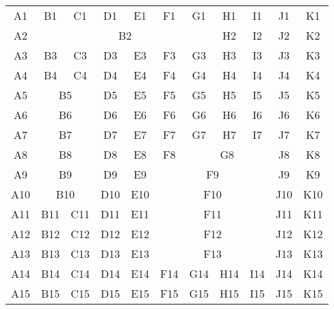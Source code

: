 \begin{tabular}{c|c|c|c|c|c|c|c|c|c|c|}
 A1 &  B1 &  C1 &  D1 &  E1 &  F1 &  G1 &  H1 &  I1 &  J1 &  K1\\
 A2 & \multicolumn{6}{c}{B2}            &  H2 &  I2 &  J2 &  K2\\
 A3 &  B3 &  C3 &  D3 &  E3 &  F3 &  G3 &  H3 &  I3 &  J3 &  K3\\
 A4 &  B4 &  C4 &  D4 &  E4 &  F4 &  G4 &  H4 &  I4 &  J4 &  K4\\
 A5 & \multicolumn{2}{c}{B5} &  D5 &  E5 &  F5 &  G5 &  H5 &  I5 &  J5 &  K5\\
 A6 & \multicolumn{2}{c}{B6} &  D6 &  E6 &  F6 &  G6 &  H6 &  I6 &  J6 &  K6\\
 A7 & \multicolumn{2}{c}{B7} &  D7 &  E7 &  F7 &  G7 &  H7 &  I7 &  J7 &  K7\\
 A8 & \multicolumn{2}{c}{B8} &  D8 &  E8 &  F8 & \multicolumn{3}{c}{G8} &  J8 &  K8\\
 A9 & \multicolumn{2}{c}{B9} &  D9 &  E9 & \multicolumn{4}{c}{F9} &  J9 &  K9\\
A10 & \multicolumn{2}{c}{B10} & D10 & E10 & \multicolumn{4}{c}{F10} & J10 & K10\\
A11 & B11 & C11 & D11 & E11 & \multicolumn{4}{c}{F11} & J11 & K11\\
A12 & B12 & C12 & D12 & E12 & \multicolumn{4}{c}{F12} & J12 & K12\\
A13 & B13 & C13 & D13 & E13 & \multicolumn{4}{c}{F13} & J13 & K13\\
A14 & B14 & C14 & D14 & E14 & F14 & G14 & H14 & I14 & J14 & K14\\
A15 & B15 & C15 & D15 & E15 & F15 & G15 & H15 & I15 & J15 & K15
\end{tabular}